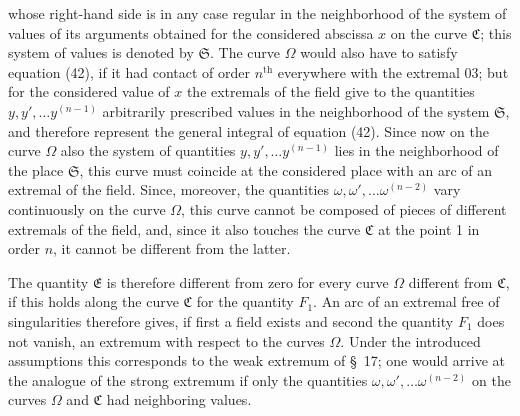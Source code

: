 \documentclass[11pt,a4paper,leqno]{article}
\begin{document}
whose right-hand side is in any case regular in the neighborhood of the system of values of its arguments obtained for the considered abscissa $x$ on the curve $\mathfrak{C}$; this system of values is denoted by $\mathfrak{S}$. The curve $\Omega$ would also have to satisfy equation (42), if it had contact of order $n^{\mathrm{th}}$ everywhere with the extremal 03; but for the considered value of $x$ the extremals of the field give to the quantities $y,y',\ldots y^{(n-1)}$ arbitrarily prescribed values in the neighborhood of the system $\mathfrak{S}$, and therefore represent the general integral of equation (42). Since now on the curve $\Omega$ also the system of quantities $y,y',\ldots y^{(n-1)}$ lies in the neighborhood of the place $\mathfrak{S}$, this curve must coincide at the considered place with an arc of an extremal of the field. Since, moreover, the quantities $\omega,\omega',\ldots\omega^{(n-2)}$ vary continuously on the curve $\Omega$, this curve cannot be composed of pieces of different extremals of the field, and, since it also touches the curve $\mathfrak{C}$ at the point 1 in order $n$, it cannot be different from the latter.

The quantity $\mathfrak{E}$ is therefore different from zero for every curve $\Omega$ different from $\mathfrak{C}$, if this holds along the curve $\mathfrak{C}$ for the
quantity $F_1$. An arc of an extremal free of singularities therefore gives, if first a field exists and second the quantity $F_1$ does not vanish, an extremum with respect to the curves $\Omega$. Under the introduced assumptions this corresponds to the weak extremum of \S~17; one would arrive at the analogue of the strong extremum if only the quantities $\omega,\omega',\ldots\omega^{(n-2)}$ on the curves $\Omega$ and $\mathfrak{C}$ had neighboring values.
\end{document}

